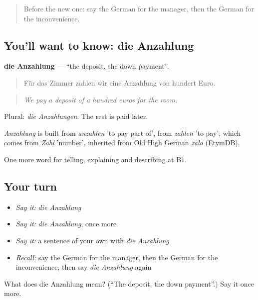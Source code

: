 \begin{quote}
Before the new one: say the German for the manager, then the German for the inconvenience.
\end{quote}

\subsection*{You'll want to know: die Anzahlung}
\textbf{die Anzahlung} — \textquotedblleft{}the deposit, the down payment\textquotedblright{}.

\begin{quote}
Für das Zimmer zahlen wir eine Anzahlung von hundert Euro.
\end{quote}

\begin{quote}
\emph{We pay a deposit of a hundred euros for the room.}
\end{quote}

Plural: \emph{die Anzahlungen}. The rest is paid later.

\begin{cousinweb}
\emph{Anzahlung} is built from \emph{anzahlen} 'to pay part of', from \emph{zahlen} 'to pay', which comes from \emph{Zahl} 'number', inherited from Old High German \emph{zala} (EtymDB).
\end{cousinweb}

\begin{grammarlens}[title={What you've built}]
One more word for telling, explaining and describing at B1.
\end{grammarlens}

\subsection*{Your turn}
\begin{itemize}
\raggedright
  \item \emph{Say it:} \emph{die Anzahlung}
  \item \emph{Say it:} \emph{die Anzahlung}, once more
  \item \emph{Say it:} a sentence of your own with \emph{die Anzahlung}
  \item \emph{Recall:} say the German for the manager, then the German for the inconvenience, then say \emph{die Anzahlung} again
\end{itemize}

\begin{tcolorbox}[breakable,colback=teal!4,colframe=teal!35!black,title={Before you move on}]
What does die Anzahlung mean? (\textquotedblleft{}The deposit, the down payment\textquotedblright{}.) Say it once more.
\end{tcolorbox}

